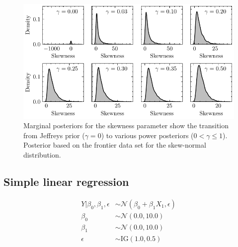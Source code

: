 \documentclass[12pt]{article}
\begin{document}
\begin{figure}[h]
\begin{center}
\includegraphics{imgs/Jeffreys.pdf}
\end{center}
\caption{Marginal posteriors for the skewness parameter show the transition from Jeffreys prior ($\gamma=0$) to various power posteriors ($0<\gamma\leq1$).  Posterior based on the frontier data set for the skew-normal distribution. }\label{fig:skew_jeff_powpos}
\end{figure}

\clearpage
\subsection{Simple linear regression}

\begin{subequations}
\begin{align}
        Y|\beta_0, \beta_1,  \epsilon  &\sim \mathcal{N} (\beta_0 + \beta_1 X_1,  \epsilon)\\
    \beta_0  &\sim \mathcal{N}(0.0, 10.0)\\
     \beta_1  &\sim \mathcal{N}(0.0, 10.0)\\
     \epsilon & \sim \text{IG}(1.0, 0.5)
\end{align}
\end{subequations}
\end{document}
